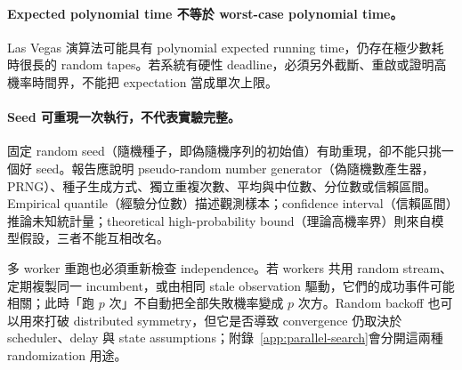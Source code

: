 \documentclass[11pt,a4paper,oneside,openany]{book}
\begin{document}
\paragraph{Expected polynomial time 不等於 worst-case polynomial time。}
Las Vegas 演算法可能具有 polynomial expected running time，仍存在極少數耗時很長的 random tapes。若系統有硬性 deadline，必須另外截斷、重啟或證明高機率時間界，不能把 expectation 當成單次上限。

\paragraph{Seed 可重現一次執行，不代表實驗完整。}
固定 random seed（隨機種子，即偽隨機序列的初始值）有助重現，卻不能只挑一個好 seed。報告應說明 pseudo-random number generator（偽隨機數產生器，PRNG）、種子生成方式、獨立重複次數、平均與中位數、分位數或信賴區間。Empirical quantile（經驗分位數）描述觀測樣本；confidence interval（信賴區間）推論未知統計量；theoretical high-probability bound（理論高機率界）則來自模型假設，三者不能互相改名。

多 worker 重跑也必須重新檢查 independence。若 workers 共用 random stream、定期複製同一 incumbent，或由相同 stale observation 驅動，它們的成功事件可能相關；此時「跑 $p$ 次」不自動把全部失敗機率變成 $p$ 次方。Random backoff 也可以用來打破 distributed symmetry，但它是否導致 convergence 仍取決於 scheduler、delay 與 state assumptions；附錄~\ref{app:parallel-search}會分開這兩種 randomization 用途。
\end{document}
